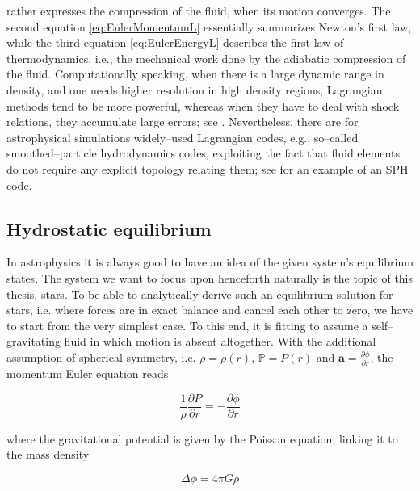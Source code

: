  rather expresses the compression of the fluid, when its motion converges.
The second equation \eqref{eq:EulerMomentumL} essentially summarizes Newton's first law, while the third equation \eqref{eq:EulerEnergyL} describes the first law of thermodynamics, i.e., the mechanical work done by the adiabatic compression of the fluid.
Computationally speaking, when there is a large dynamic range in density, and one needs higher resolution in high density regions, Lagrangian methods tend to be more powerful, whereas when they have to deal with shock relations, they accumulate large errors; see \citet{SPH_shock}.
Nevertheless, there are for astrophysical simulations widely--used Lagrangian codes, e.g., so--called smoothed--particle hydrodynamics codes, exploiting the fact that fluid elements do not require any explicit topology relating them; see \citet{Gadget} for an example of an SPH code.

\subsection{Hydrostatic equilibrium}
\label{subsec:Hydrostatic_equilibrium}

In astrophysics it is always good to have an idea of the given system's equilibrium states.
The system we want to focus upon henceforth naturally is the topic of this thesis, stars.
To be able to analytically derive such an equilibrium solution for stars, i.e. where forces are in exact balance and cancel each other to zero, we have to start from the very simplest case.
To this end, it is fitting to assume a self--gravitating fluid in which motion is absent altogether.
With the additional assumption of spherical symmetry, i.e. $\rho = \rho(r)$, $\mathbb{P} = P(r)$ and $\textbf{a} = \frac{\partial\phi}{\partial r}$, the momentum Euler equation reads

\begin{equation}
  \frac{1}{\rho}\frac{\partial P}{\partial r} = -\frac{\partial\phi}{\partial r}
\label{eq:Hydrostatic_equilibrium}
\end{equation}

where the gravitational potential is given by the Poisson equation, linking it to the mass density

\begin{equation}
  \Delta\phi = 4\pi G\rho
\end{equation}

